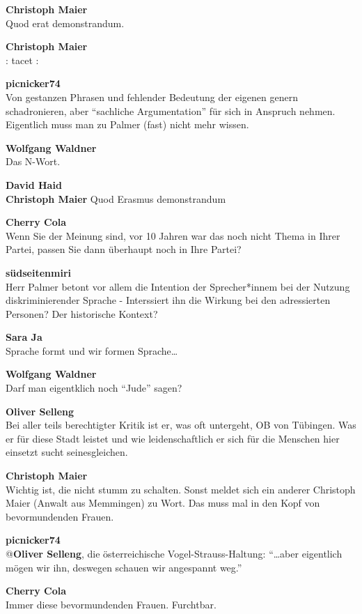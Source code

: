 \documentclass[]{article}
\begin{document}
\textbf{Christoph Maier}\\
Quod erat demonstrandum.

\textbf{Christoph Maier}\\
\textbar{}\textbar{}: tacet :\textbar{}\textbar{}

\textbf{picnicker74}\\
Von gestanzen Phrasen und fehlender Bedeutung der eigenen genern
schadronieren, aber ``sachliche Argumentation'' für sich in Anspruch
nehmen. Eigentlich muss man zu Palmer (fast) nicht mehr wissen.

\textbf{Wolfgang Waldner}\\
Das N-Wort. 🙂

\textbf{David Haid}\\
\textbf{Christoph Maier} Quod Erasmus demonstrandum

\textbf{Cherry Cola}\\
Wenn Sie der Meinung sind, vor 10 Jahren war das noch nicht Thema in
Ihrer Partei, passen Sie dann überhaupt noch in Ihre Partei?

\textbf{südseitenmiri}\\
Herr Palmer betont vor allem die Intention der Sprecher*innem bei der
Nutzung diskriminierender Sprache - Interssiert ihn die Wirkung bei den
adressierten Personen? Der historische Kontext?

\textbf{Sara Ja}\\
Sprache formt und wir formen Sprache\ldots{}

\textbf{Wolfgang Waldner}\\
Darf man eigentklich noch ``Jude'' sagen?

\textbf{Oliver Selleng}\\
Bei aller teils berechtigter Kritik ist er, was oft untergeht, OB von
Tübingen. Was er für diese Stadt leistet und wie leidenschaftlich er
sich für die Menschen hier einsetzt sucht seinesgleichen.

\textbf{Christoph Maier}\\
Wichtig ist, die nicht stumm zu schalten. Sonst meldet sich ein anderer
Christoph Maier\cite{christophmaiermdl}
(Anwalt aus Memmingen\cite{anwalt}) zu Wort. Das muss mal
in den Kopf von bevormundenden Frauen.\cite{bevormundendefrauen}

\textbf{picnicker74}\\
@\textbf{Oliver Selleng}, die österreichische Vogel-Strauss-Haltung:
``\ldots{}aber eigentlich mögen wir ihn, deswegen schauen wir angespannt
weg.''

\textbf{Cherry Cola}\\
Immer diese bevormundenden Frauen. Furchtbar.
\end{document}
